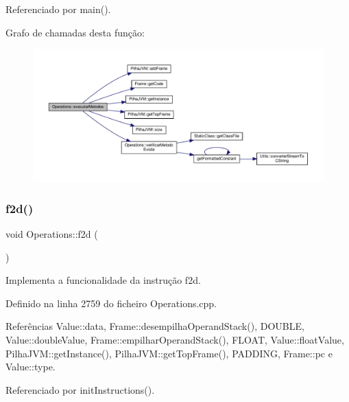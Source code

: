Referenciado por main().

Grafo de chamadas desta função\+:
\nopagebreak
\begin{figure}[H]
\begin{center}
\leavevmode
\includegraphics[width=350pt]{classOperations_ab771bdb83af6f55d93d126b944d4e73b_cgraph}
\end{center}
\end{figure}
\mbox{\label{classOperations_afb29ca09bc75d3342920b1509aba3635}} 
\subsubsection{\texorpdfstring{f2d()}{f2d()}}
{\footnotesize\ttfamily void Operations\+::f2d (\begin{DoxyParamCaption}{ }\end{DoxyParamCaption})\hspace{0.3cm}{\ttfamily [private]}}



Implementa a funcionalidade da instrução f2d. 



Definido na linha 2759 do ficheiro Operations.\+cpp.



Referências Value\+::data, Frame\+::desempilha\+Operand\+Stack(), D\+O\+U\+B\+LE, Value\+::double\+Value, Frame\+::empilhar\+Operand\+Stack(), F\+L\+O\+AT, Value\+::float\+Value, Pilha\+J\+V\+M\+::get\+Instance(), Pilha\+J\+V\+M\+::get\+Top\+Frame(), P\+A\+D\+D\+I\+NG, Frame\+::pc e Value\+::type.



Referenciado por init\+Instructions().

